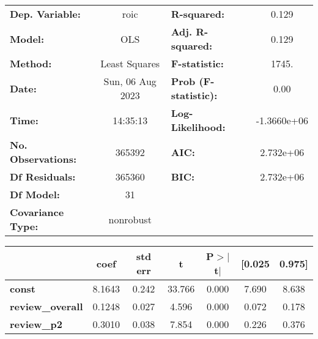 \begin{center}
\begin{tabular}{lclc}
\toprule
\textbf{Dep. Variable:}                                               &       roic       & \textbf{  R-squared:         } &      0.129   \\
\textbf{Model:}                                                       &       OLS        & \textbf{  Adj. R-squared:    } &      0.129   \\
\textbf{Method:}                                                      &  Least Squares   & \textbf{  F-statistic:       } &      1745.   \\
\textbf{Date:}                                                        & Sun, 06 Aug 2023 & \textbf{  Prob (F-statistic):} &      0.00    \\
\textbf{Time:}                                                        &     14:35:13     & \textbf{  Log-Likelihood:    } & -1.3660e+06  \\
\textbf{No. Observations:}                                            &      365392      & \textbf{  AIC:               } &  2.732e+06   \\
\textbf{Df Residuals:}                                                &      365360      & \textbf{  BIC:               } &  2.732e+06   \\
\textbf{Df Model:}                                                    &          31      & \textbf{                     } &              \\
\textbf{Covariance Type:}                                             &    nonrobust     & \textbf{                     } &              \\
\bottomrule
\end{tabular}
\begin{tabular}{lcccccc}
                                                                      & \textbf{coef} & \textbf{std err} & \textbf{t} & \textbf{P$> |$t$|$} & \textbf{[0.025} & \textbf{0.975]}  \\
\midrule
\textbf{const}                                                        &       8.1643  &        0.242     &    33.766  &         0.000        &        7.690    &        8.638     \\
\textbf{review\_overall}                                              &       0.1248  &        0.027     &     4.596  &         0.000        &        0.072    &        0.178     \\
\textbf{review\_p2}                                                   &       0.3010  &        0.038     &     7.854  &         0.000        &        0.226    &        0.376     \\

\end{tabular}
\end{center}
